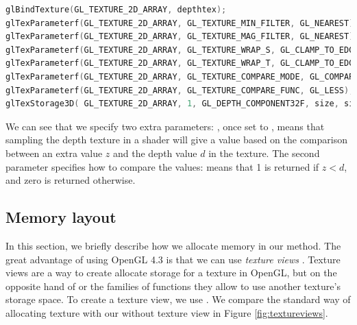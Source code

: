 \begin{lstlisting}[language=C++,label=lst:textureconfshadow,caption={Configuration of a shadow map depth texture.}]
glBindTexture(GL_TEXTURE_2D_ARRAY, depthtex);
glTexParameterf(GL_TEXTURE_2D_ARRAY, GL_TEXTURE_MIN_FILTER, GL_NEAREST);
glTexParameterf(GL_TEXTURE_2D_ARRAY, GL_TEXTURE_MAG_FILTER, GL_NEAREST);
glTexParameterf(GL_TEXTURE_2D_ARRAY, GL_TEXTURE_WRAP_S, GL_CLAMP_TO_EDGE);
glTexParameterf(GL_TEXTURE_2D_ARRAY, GL_TEXTURE_WRAP_T, GL_CLAMP_TO_EDGE);
glTexParameterf(GL_TEXTURE_2D_ARRAY, GL_TEXTURE_COMPARE_MODE, GL_COMPARE_REF_TO_TEXTURE);
glTexParameterf(GL_TEXTURE_2D_ARRAY, GL_TEXTURE_COMPARE_FUNC, GL_LESS);
glTexStorage3D(	GL_TEXTURE_2D_ARRAY, 1, GL_DEPTH_COMPONENT32F, size, size, layers);
\end{lstlisting}

We can see that we specify two extra parameters: , once set to , means that sampling the depth texture in a shader will give a value based on the comparison between an extra value $z$ and the depth value $d$ in the texture. The second parameter  specifies how to compare the values:  means that 1 is returned if $z<d$, and zero is returned otherwise. 

\subsection{Memory layout}
\label{sec:memorylayout}
In this section, we briefly describe how we allocate memory in our method. The great advantage of using OpenGL 4.3 is that we can use \emph{texture views} \citep{openglspec}. Texture views are a way to create allocate storage for a texture in OpenGL, but on the opposite hand of  or the  families of functions they allow to use another texture's storage space. To create a texture view, we use . We compare the standard way of allocating texture with our without texture view in Figure \ref{fig:textureviews}.

